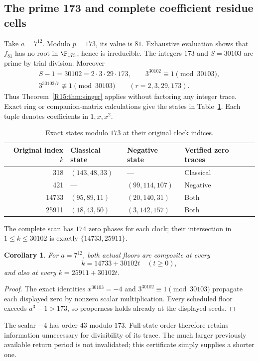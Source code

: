 \documentclass[11pt,a4paper]{article}
\newtheorem{corollary}[theorem]{Corollary}\newtheorem{mainthm}[theorem]{Theorem}
\theoremstyle{definition}\newtheorem{definition}[theorem]{Definition}
\theoremstyle{remark}\newtheorem{remark}[theorem]{Remark}
\begin{document}
\subsection{The prime 173 and complete coefficient residue cells}

Take $a=7^{12}$. Modulo $p=173$, its value is $81$.
Exhaustive evaluation shows that $f_{81}$ has no root in $\F_{173}$,
hence is irreducible. The integers $173$ and $S=30103$ are prime by
trial division. Moreover
\[
 \begin{gathered}
 S-1=30102=2\cdot3\cdot29\cdot173,
 \qquad 3^{30102}\equiv1\pmod{30103},\\
 3^{30102/r}\not\equiv1\pmod{30103}
 \qquad(r=2,3,29,173).
 \end{gathered}
\]
Thus Theorem~\ref{R15:thm:singer} applies without factoring any integer
trace. Exact ring or companion-matrix calculations give the states
in Table~\ref{R15:tab:173}. Each tuple denotes coefficients in $1,x,x^2$.
\begin{table}[ht]
\centering
\begin{tabular}{rlll}
\toprule
Original index $k$ & Classical state & Negative state & Verified zero traces\\
\midrule
318 & $(143,48,33)$ & --- & Classical\\
421 & --- & $(99,114,107)$ & Negative\\
14733 & $(95,89,11)$ & $(20,140,31)$ & Both\\
25911 & $(18,43,50)$ & $(3,142,157)$ & Both\\
\bottomrule
\end{tabular}
\caption{Exact states modulo $173$ at their original clock indices.}
\label{R15:tab:173}
\end{table}
The complete scan has $174$ zero phases for each clock; their intersection
in $1\le k\le30102$ is exactly $\{14733,25911\}$.

\begin{corollary}\label{R15:cor:173}
For $a=7^{12}$, both actual floors are composite at every
\[
 k=14733+30102t\quad(t\ge0),
\]
and also at every $k=25911+30102t$.
\end{corollary}
\begin{proof}
The exact identities $x^{30103}=-4$ and
$3^{30102}\equiv1\pmod{30103}$ propagate each displayed zero
by nonzero scalar multiplication. Every scheduled floor exceeds
$a^3-1>173$, so properness holds already at the displayed seeds.
\end{proof}
The scalar $-4$ has order $43$ modulo $173$. Full-state order therefore
retains information unnecessary for divisibility of its trace.
The much larger previously available return period is not invalidated;
this certificate simply supplies a shorter one.
\end{document}
